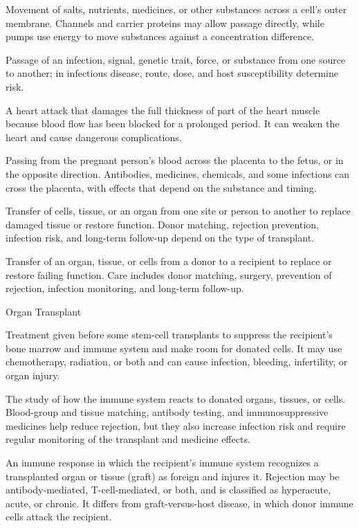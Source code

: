  Movement of salts, nutrients, medicines, or other substances across a cell’s outer membrane. Channels and carrier proteins may allow passage directly, while pumps use energy to move substances against a concentration difference.

 Passage of an infection, signal, genetic trait, force, or substance from one source to another; in infectious disease, route, dose, and host susceptibility determine risk.

 A heart attack that damages the full thickness of part of the heart muscle because blood flow has been blocked for a prolonged period. It can weaken the heart and cause dangerous complications.

 Passing from the pregnant person's blood across the placenta to the fetus, or in the opposite direction. Antibodies, medicines, chemicals, and some infections can cross the placenta, with effects that depend on the substance and timing.

 Transfer of cells, tissue, or an organ from one site or person to another to replace damaged tissue or restore function. Donor matching, rejection prevention, infection risk, and long-term follow-up depend on the type of transplant.

 Transfer of an organ, tissue, or cells from a donor to a recipient to replace or restore failing function. Care includes donor matching, surgery, prevention of rejection, infection monitoring, and long-term follow-up.

\synonyms
Organ Transplant

 Treatment given before some stem-cell transplants to suppress the recipient's bone marrow and immune system and make room for donated cells. It may use chemotherapy, radiation, or both and can cause infection, bleeding, infertility, or organ injury.

 The study of how the immune system reacts to donated organs, tissues, or cells. Blood-group and tissue matching, antibody testing, and immunosuppressive medicines help reduce rejection, but they also increase infection risk and require regular monitoring of the transplant and medicine effects.

 An immune response in which the recipient's immune system recognizes
a transplanted organ or tissue (graft) as foreign and injures it. Rejection may be antibody-mediated,
T-cell-mediated, or both, and is classified as hyperacute, acute, or chronic. It differs from
graft-versus-host disease, in which donor immune cells attack the recipient.

